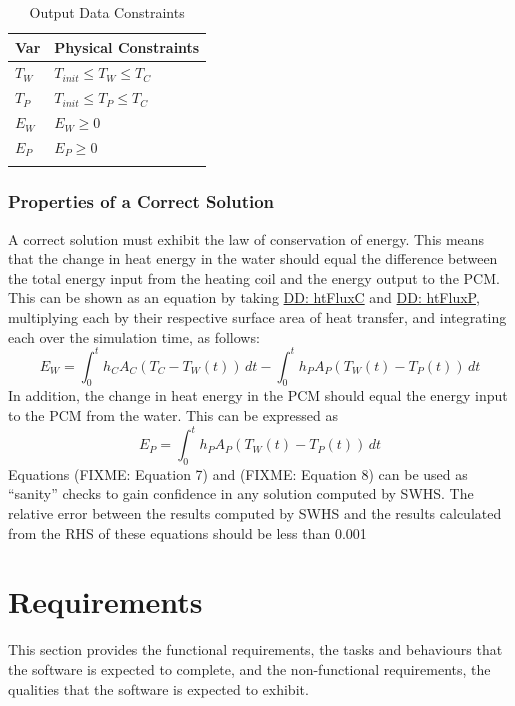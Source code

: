 \documentclass[12pt]{article}
\begin{document}
\begin{longtable}{l l}
\toprule
Var & Physical Constraints
\\
\midrule
\endhead
${T_{W}}$ & ${T_{init}}\leq{}{T_{W}}\leq{}{T_{C}}$
\\
${T_{P}}$ & ${T_{init}}\leq{}{T_{P}}\leq{}{T_{C}}$
\\
${E_{W}}$ & ${E_{W}}\geq{}0$
\\
${E_{P}}$ & ${E_{P}}\geq{}0$
\\
\bottomrule
\caption{Output Data Constraints}
\label{Table:OutDataConstraints}
\end{longtable}
\subsubsection{Properties of a Correct Solution}
\label{Sec:CorSolProps}
A correct solution must exhibit the law of conservation of energy. This means that the change in heat energy in the water should equal the difference between the total energy input from the heating coil and the energy output to the PCM. This can be shown as an equation by taking \hyperref[DD:htFluxC]{DD: htFluxC} and \hyperref[DD:htFluxP]{DD: htFluxP}, multiplying each by their respective surface area of heat transfer, and integrating each over the simulation time, as follows:
\begin{displaymath}
{E_{W}}=\int_{0}^{t}{{h_{C}} {A_{C}} \left({T_{C}}-{T_{W}}\left(t\right)\right)}\,dt-\int_{0}^{t}{{h_{P}} {A_{P}} \left({T_{W}}\left(t\right)-{T_{P}}\left(t\right)\right)}\,dt
\end{displaymath}
In addition, the change in heat energy in the PCM should equal the energy input to the PCM from the water. This can be expressed as
\begin{displaymath}
{E_{P}}=\int_{0}^{t}{{h_{P}} {A_{P}} \left({T_{W}}\left(t\right)-{T_{P}}\left(t\right)\right)}\,dt
\end{displaymath}
Equations (FIXME: Equation 7) and (FIXME: Equation 8) can be used as ``sanity'' checks to gain confidence in any solution computed by SWHS. The relative error between the results computed by SWHS and the results calculated from the RHS of these equations should be less than 0.001%
\section{Requirements}
\label{Sec:Requirements}
This section provides the functional requirements, the tasks and behaviours that the software is expected to complete, and the non-functional requirements, the qualities that the software is expected to exhibit.
\end{document}
